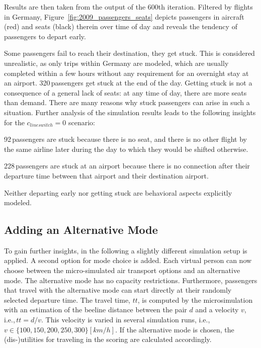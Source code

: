 
Results are then taken from the output of the 600th iteration. 
Filtered by flights in Germany, Figure~\ref{fig:2009_passengers_seats} depicts passengers in aircraft (red) and seats (black) therein over time of day
and reveals the tendency of passengers to depart early. 

Some passengers fail to reach their destination, they get stuck.   
This is considered unrealistic, as only trips within Germany are modeled, which are usually completed within a few hours without any requirement for an overnight stay at an airport. 
320\,passengers get stuck at the end of the day. 
Getting stuck is not a consequence of a general lack of seats: at any time of day, there are more seats than demand.  
%
There are many reasons why stuck passengers can arise in such a situation.
%
Further analysis of the simulation results leads to the following insights for the $c_{lineswitch} = 0$ scenario:
\begin{compactitem}
\item 92\,passengers are stuck because there is no seat, and there is no other flight by the same airline later during the day to which they would be shifted otherwise.
\item 228\,passengers are stuck at an airport because there is no connection after their departure time 
	between that airport and their destination airport. 
\end{compactitem}

Neither departing early nor getting stuck are behavioral aspects explicitly modeled.  

\subsection{Adding an Alternative Mode}
To gain further insights, in the following a slightly different simulation setup is applied. 
A second option for mode choice is added. 
Each virtual person can now choose between the micro-simulated air transport options and an alternative mode. 
The alternative mode has no capacity restrictions. 
Furthermore, passengers that travel with the alternative mode can start directly at their randomly selected departure time. 
The travel time, $tt$, is computed by the microsimulation with an estimation of the beeline distance between the  pair $d$ and a velocity $v$, i.e.,\,$tt = d / v$.  
This velocity is varied in several simulation runs, i.e.,\,$v \in \{100, 150, 200, 250, 300 \} [km/h]$. 
If the alternative mode is chosen, the (dis-)utilities for traveling in the scoring are calculated accordingly.  

